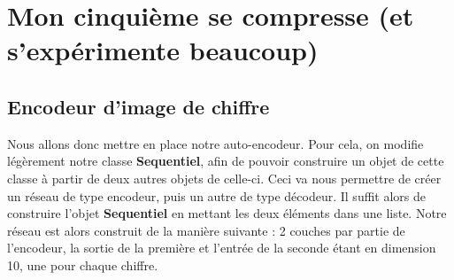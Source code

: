 \documentclass{article}
\begin{document}
\section{Mon cinquième se compresse (et s'expérimente beaucoup)}
\subsection{Encodeur d'image de chiffre}
Nous allons donc mettre en place notre auto-encodeur. Pour cela, on modifie légèrement notre classe \textbf{Sequentiel}, afin de pouvoir construire un objet de cette classe à partir de deux autres objets de celle-ci.
Ceci va nous permettre de créer un réseau de type encodeur, puis un autre de type décodeur. Il suffit alors de construire l'objet \textbf{Sequentiel} en mettant les deux éléments dans une liste.
Notre réseau est alors construit de la manière suivante : 2 couches par partie de l'encodeur, la sortie de la première et l'entrée de la seconde étant en dimension 10, une pour chaque chiffre.
\end{document}
